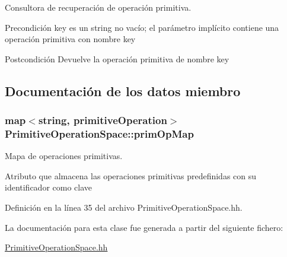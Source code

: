 Consultora de recuperación de operación primitiva. 

\begin{DoxyPrecond}{Precondición}
\textquotesingle{}key\textquotesingle{} es un string no vacío; el parámetro implícito contiene una operación primitiva con nombre \textquotesingle{}key\textquotesingle{} 
\end{DoxyPrecond}
\begin{DoxyPostcond}{Postcondición}
Devuelve la operación primitiva de nombre \textquotesingle{}key\textquotesingle{} 
\end{DoxyPostcond}


\subsection{Documentación de los datos miembro}
\subsubsection[{\texorpdfstring{prim\+Op\+Map}{primOpMap}}]{\setlength{\rightskip}{0pt plus 5cm}map$<$string, {\bf primitive\+Operation}$>$ Primitive\+Operation\+Space\+::prim\+Op\+Map\hspace{0.3cm}{\ttfamily [private]}}\hypertarget{class_primitive_operation_space_afd359615001ed1e9b44b9618287834ec}{}\label{class_primitive_operation_space_afd359615001ed1e9b44b9618287834ec}


Mapa de operaciones primitivas. 

Atributo que almacena las operaciones primitivas predefinidas con su identificador como clave 

Definición en la línea 35 del archivo Primitive\+Operation\+Space.\+hh.



La documentación para esta clase fue generada a partir del siguiente fichero\+:\begin{DoxyCompactItemize}
\item 
\hyperlink{_primitive_operation_space_8hh}{Primitive\+Operation\+Space.\+hh}\end{DoxyCompactItemize}
